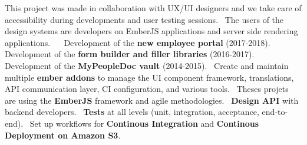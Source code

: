 \documentclass{moderncv}
\begin{document}
{	This project was made in collaboration with UX/UI designers and we take care of accessibility during developments and user testing sessions.\newline~
	The users of the design systems are developers on EmberJS applications and server side rendering applications.\newline~
	\newline~
	Development of the \textbf{new employee portal} (2017-2018).\newline~
	Development of the \textbf{form builder and filler libraries} (2016-2017).\newline~
	Development of the \textbf{MyPeopleDoc vault} (2014-2015).\newline~
	Create and maintain multiple \textbf{ember addons} to manage the UI component framework, translations, API communication layer, CI configuration, and various tools.\newline~
	Theses projets are using the \textbf{EmberJS} framework and agile methodologies.\newline~
	\textbf{Design API} with backend developers.\newline~
	\textbf{Tests} at all levels (unit, integration, acceptance, end-to-end).\newline~
	Set up workflows for \textbf{Continous Integration} and \textbf{Continous Deployment on Amazon S3}.
}



\end{document}
